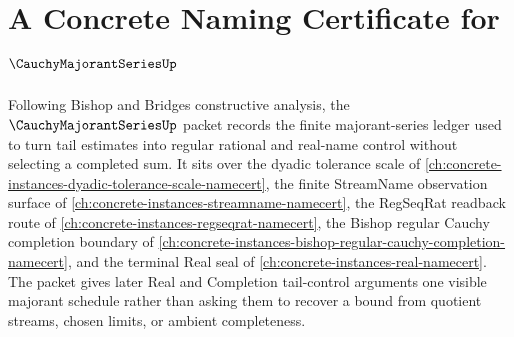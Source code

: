 \chapter{A Concrete Naming Certificate for $\CauchyMajorantSeriesUp$}
\label{ch:concrete-instances-cauchy-majorant-series-namecert}

Following Bishop and Bridges constructive analysis, the $\CauchyMajorantSeriesUp$ packet records the finite majorant-series ledger used to turn tail estimates into regular rational and real-name control without selecting a completed sum. It sits over the dyadic tolerance scale of \autoref{ch:concrete-instances-dyadic-tolerance-scale-namecert}, the finite StreamName observation surface of \autoref{ch:concrete-instances-streamname-namecert}, the RegSeqRat readback route of \autoref{ch:concrete-instances-regseqrat-namecert}, the Bishop regular Cauchy completion boundary of \autoref{ch:concrete-instances-bishop-regular-cauchy-completion-namecert}, and the terminal Real seal of \autoref{ch:concrete-instances-real-namecert}. The packet gives later Real and Completion tail-control arguments one visible majorant schedule rather than asking them to recover a bound from quotient streams, chosen limits, or ambient completeness.

